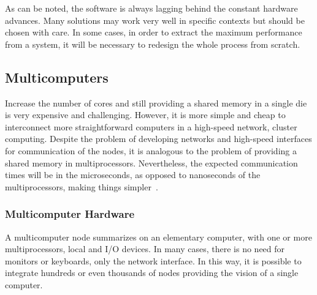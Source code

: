 			As can be noted, the software is always lagging behind the constant hardware advances.
			Many solutions may work very well in specific contexts but should be chosen with care.
			In some cases, in order to extract the maximum performance from a system, it will be
			necessary to redesign the whole process from scratch.

	\subsection{Multicomputers}
	\label{sec.multicomputers}

		Increase the number of cores and still providing a shared memory in a
		single die is very expensive and challenging.
		However, it is more simple and cheap to interconnect more straightforward
		computers in a high-speed network, \eg cluster computing.
		Despite the problem of developing networks and high-speed interfaces
		for communication of the nodes, it is analogous to the problem of
		providing a shared memory in multiprocessors.
		Nevertheless, the expected communication times will be in the
		microseconds, as opposed to nanoseconds of the multiprocessors,
		making things simpler~\cite{tanenbaum:4ed}.

			\subsubsection{Multicomputer Hardware}
			\label{sec.multicomputers-hw}

				A multicomputer node summarizes on an elementary computer, with one or
				more multiprocessors, local \ram and I/O devices.
				In many cases, there is no need for monitors or keyboards, only the
				network interface.
				In this way, it is possible to integrate hundreds or even thousands
				of nodes providing the vision of a single computer.

